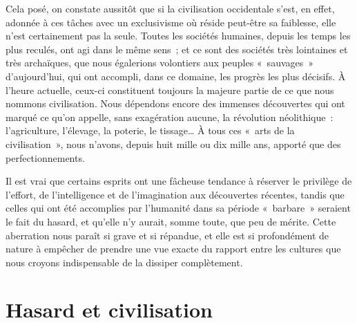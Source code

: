 \documentclass[french,twoside]{book} %
\begin{document}
Cela posé, on constate aussitôt que si la civilisation occidentale s’est, en effet, adonnée à ces tâches avec un exclusivisme où réside peut-être sa faiblesse, elle n’est certainement pas la seule. Toutes les sociétés humaines, depuis les temps les plus reculés, ont agi dans le même sens ; et ce sont des sociétés très lointaines et très archaïques, que nous égalerions volontiers aux peuples « sauvages » d’aujourd’hui, qui ont accompli, dans ce domaine, les progrès les plus décisifs. À l’heure actuelle, ceux-ci constituent toujours la majeure partie de ce que nous nommons civilisation. Nous dépendons encore des immenses découvertes qui ont marqué ce qu’on appelle, sans exagération aucune, la révolution néolithique : l’agriculture, l’élevage, la poterie, le tissage… À tous ces « arts de la civilisation », nous n’avons, depuis huit mille ou dix mille ans, apporté que des perfectionnements.\par
Il est vrai que certains esprits ont une fâcheuse tendance à réserver le privilège de l’effort, de l’intelligence et de l’imagination aux découvertes récentes, tandis que celles qui ont été accomplies par l’humanité dans sa période « barbare » seraient le fait du hasard, et qu’elle n’y aurait, somme toute, que peu de mérite. Cette aberration nous paraît si grave et si répandue, et elle est si profondément de nature à empêcher de prendre une vue exacte du rapport entre les cultures que nous croyons indispensable de la dissiper complètement.

\section[{Hasard et civilisation}]{Hasard et civilisation}
\renewcommand{\leftmark}{Hasard et civilisation}
\end{document}

